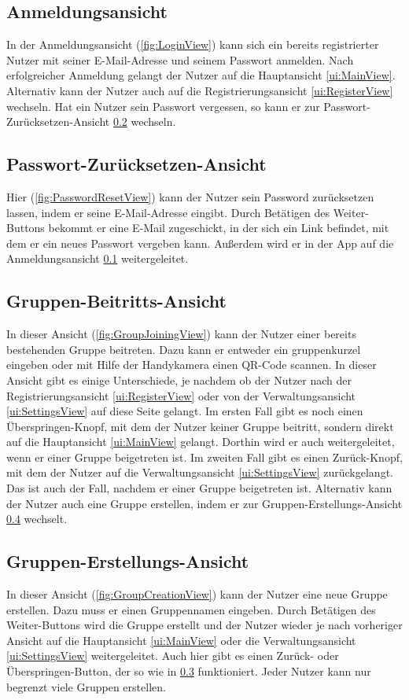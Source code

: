 \documentclass[parskip=full]{scrartcl}
\begin{document}
\subsection{Anmeldungsansicht}
\label{ui:LoginView}
In der Anmeldungsansicht (\autoref{fig:LoginView}) kann sich ein bereits registrierter Nutzer mit seiner E-Mail-Adresse und seinem Passwort anmelden. Nach erfolgreicher Anmeldung gelangt der Nutzer auf die Hauptansicht \ref{ui:MainView}. Alternativ kann der Nutzer auch auf die Registrierungsansicht \ref{ui:RegisterView} wechseln.
Hat ein Nutzer sein Passwort vergessen, so kann er zur Passwort-Zurücksetzen-Ansicht \ref{ui:PasswordResetView} wechseln.

\subsection{Passwort-Zurücksetzen-Ansicht}
\label{ui:PasswordResetView}
Hier (\autoref{fig:PasswordResetView}) kann der Nutzer sein Password zurücksetzen lassen, indem er seine E-Mail-Adresse eingibt. Durch Betätigen des Weiter-Buttons bekommt er eine E-Mail zugeschickt, in der sich ein Link befindet, mit dem er ein neues Passwort vergeben kann. Außerdem wird er in der App auf die Anmeldungsansicht \ref{ui:LoginView} weitergeleitet.

\subsection{Gruppen-Beitritts-Ansicht}
\label{ui:GroupJoiningView}
In dieser Ansicht (\autoref{fig:GroupJoiningView}) kann der Nutzer einer bereits bestehenden Gruppe beitreten. Dazu kann er entweder ein \gls{gruppenkurzel} eingeben oder mit Hilfe der Handykamera einen QR-Code scannen. In dieser Ansicht gibt es einige Unterschiede, je nachdem ob der Nutzer nach der Registrierungsansicht \ref{ui:RegisterView} oder von der Verwaltungsansicht \ref{ui:SettingsView} auf diese Seite gelangt. Im ersten Fall gibt es noch einen Überspringen-Knopf, mit dem der Nutzer keiner Gruppe beitritt, sondern direkt auf die Hauptansicht \ref{ui:MainView} gelangt. Dorthin wird er auch weitergeleitet, wenn er einer Gruppe beigetreten ist. Im zweiten Fall gibt es einen Zurück-Knopf, mit dem der Nutzer auf die Verwaltungsansicht \ref{ui:SettingsView} zurückgelangt. Das ist auch der Fall, nachdem er einer Gruppe beigetreten ist.
Alternativ kann der Nutzer auch eine Gruppe erstellen, indem er zur Gruppen-Erstellungs-Ansicht \ref{ui:GroupCreationView} wechselt.

\subsection{Gruppen-Erstellungs-Ansicht}
\label{ui:GroupCreationView}
In dieser Ansicht (\autoref{fig:GroupCreationView}) kann der Nutzer eine neue Gruppe erstellen. Dazu muss er einen Gruppennamen eingeben. Durch Betätigen des Weiter-Buttons wird die Gruppe erstellt und der Nutzer wieder je nach vorheriger Ansicht auf die Hauptansicht \ref{ui:MainView} oder die Verwaltungsansicht \ref{ui:SettingsView} weitergeleitet. Auch hier gibt es einen Zurück- oder Überspringen-Button, der so wie in \ref{ui:GroupJoiningView} funktioniert. Jeder Nutzer kann nur begrenzt viele Gruppen erstellen.
\end{document}
